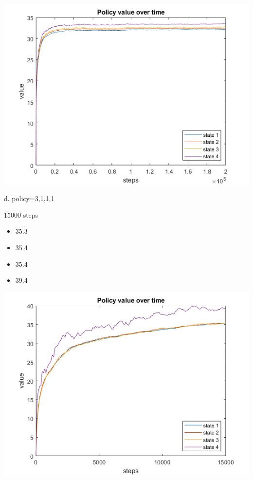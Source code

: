 \documentclass{article}
\begin{document}
\begin{center}
    \includegraphics[scale=1]{1c-2.png}
\end{center}

\noindent
d. 
policy=3,1,1,1

15000 steps
\begin{itemize}
    \item 35.3
    \item 35.4
    \item 35.4
    \item 39.4
\end{itemize}

\begin{center}
    \includegraphics[scale=1]{1d.png}
\end{center}
\end{document}

